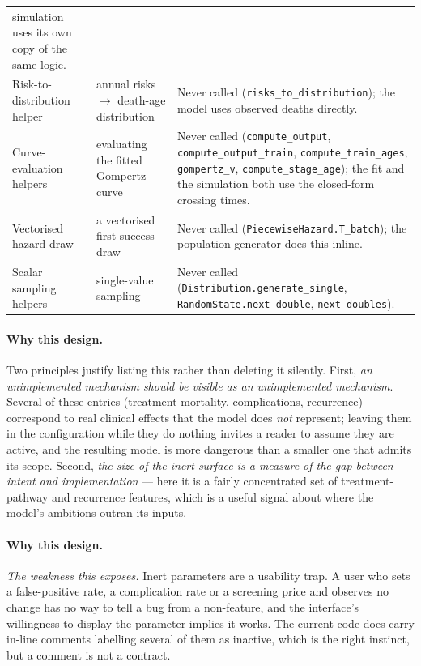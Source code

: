 \documentclass[12pt,a4paper]{article}
\newcommand{\id}[1]{\texttt{#1}}
\newcommand{\why}[1]{\paragraph{Why this design.} #1}
\begin{document}
{\begin{center}
\begin{tabular}{@{}p{4.3cm}p{3.8cm}p{7.2cm}@{}}
simulation uses its own copy of the same logic. \\
Risk-to-distribution helper & annual risks $\rightarrow$ death-age distribution & Never called
(\id{risks\_to\_distribution}); the model uses observed deaths directly. \\
Curve-evaluation helpers & evaluating the fitted Gompertz curve & Never called (\id{compute\_output},
\id{compute\_output\_train}, \id{compute\_train\_ages}, \id{gompertz\_v}, \id{compute\_stage\_age}); the fit
and the simulation both use the closed-form crossing times. \\
Vectorised hazard draw & a vectorised first-success draw & Never called (\id{PiecewiseHazard.T\_batch}); the
population generator does this inline. \\
Scalar sampling helpers & single-value sampling & Never called (\id{Distribution.generate\_single},
\id{RandomState.next\_double}, \id{next\_doubles}). \\
\bottomrule
\end{tabular}
\end{center}}

\why{Two principles justify listing this rather than deleting it silently.
First, \emph{an unimplemented mechanism should be visible as an unimplemented mechanism}. Several of these
entries (treatment mortality, complications, recurrence) correspond to real clinical effects that the model
does \emph{not} represent; leaving them in the configuration while they do nothing invites a reader to
assume they are active, and the resulting model is more dangerous than a smaller one that admits its scope.
Second, \emph{the size of the inert surface is a measure of the gap between intent and implementation} ---
here it is a fairly concentrated set of treatment-pathway and recurrence features, which is a useful signal
about where the model's ambitions outran its inputs.}

\why{\emph{The weakness this exposes.} Inert parameters are a usability trap. A user who sets a false-positive
rate, a complication rate or a screening price and observes no change has no way to tell a bug from a
non-feature, and the interface's willingness to display the parameter implies it works. The current code
does carry in-line comments labelling several of them as inactive, which is the right instinct, but a
comment is not a contract.}
\end{document}
